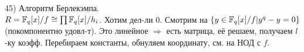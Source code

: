 45) Алгоритм Берлекэмпа.\\
$R=\mathbb{F}_q[x]/f \cong \prod \mathbb{F}_q[x]/h_i$. Хотим дел-ли 0. Смотрим на $\{y\in \mathbb{F}_q[x]/f | y^q-y=0 \}$ (покомпонентно удовл-т). Это линейное $\Rightarrow$ есть матрица, её решаем, получаем $l$-ку коэфф. Перебираем константы, обнуляем координату, см. на НОД с $f$.\\

